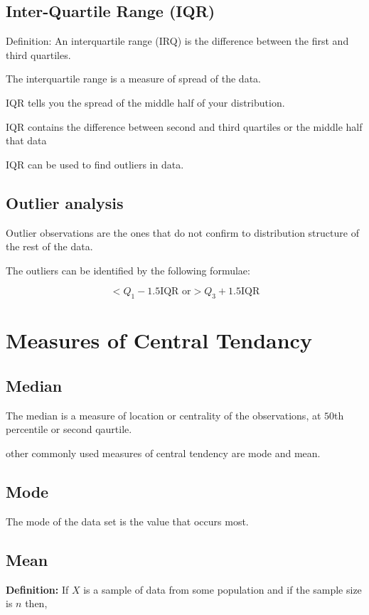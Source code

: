 \documentclass[12pt]{article}
\begin{document}
\subsection{Inter-Quartile Range (IQR)}
Definition: An interquartile range (IRQ) is the difference between the first and third quartiles.

The interquartile range is a measure of spread of the data.

IQR tells you the spread of the middle half of your distribution.

IQR contains the {difference between} second and third quartiles  or the middle half that data

IQR can be used to find outliers in data.

\subsection{Outlier analysis}

Outlier observations are the ones that do not confirm to distribution structure of the rest of the data.

The outliers can be identified by the following formulae:

\begin{equation}
    < Q_1 - 1.5\text{IQR or} > Q_3 + 1.5\text{IQR}
\end{equation}
\newpage

\section{Measures of Central Tendancy}

\subsection{Median}
The median is a measure of location or centrality of the observations, at $50$th percentile or second qaurtile.

other commonly used measures of central tendency are mode and mean.
\subsection{Mode}
The mode of the data set is the value that occurs most.
\subsection{Mean}

\textbf{Definition: }If $X$ is a sample of data from some population and if the sample size is $n$ then,
\end{document}
